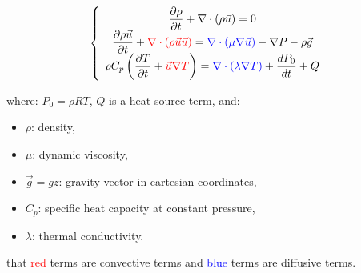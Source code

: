 $$
\left\{
\begin{array}{c}
\displaystyle{\frac{\partial \rho }{\partial t} + \nabla \cdot (\rho \vec u) =0 }\\
\displaystyle{ \frac{\partial \rho \vec u}{\partial t} + \textcolor{red}{\nabla \cdot (\rho \vec u \vec u)} =  \textcolor{blue}{\nabla \cdot \left(\mu \nabla \vec u \right)} - \nabla P -\rho \vec g }\\
\displaystyle{ \rho C_p \left( \frac{\partial T}{\partial t} + \textcolor{red}{\vec u \nabla T} \right) = \textcolor{blue}{\nabla \cdot \left(\lambda \nabla T\right)} + \frac{dP_0}{dt} + Q }
\end{array}
\right.
$$

where: $P_0=\rho R T$, $Q$ is a heat source term, and:

\begin{itemize}
\item $\rho$: density,
\item $\mu$: dynamic viscosity,
\item $\vec g=g z$: gravity vector in cartesian coordinates,
\item $C_p$: specific heat capacity at constant pressure,
\item $\lambda$: thermal conductivity.
\end{itemize}

\Note that \textcolor{red}{red} terms are convective terms and \textcolor{blue}{blue} terms are diffusive terms.\\


